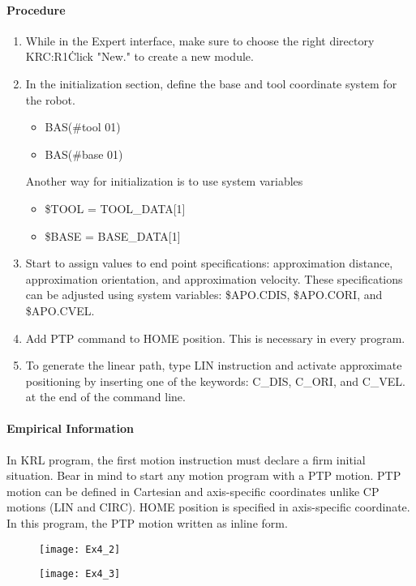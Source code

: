 \documentclass[]{book}
\begin{document}
\paragraph{Procedure}
\begin{enumerate}
	\item While in the Expert interface, make sure to choose the right directory KRC:R1\.Click "New." to create a new module.
	\item In the initialization section, define the base and tool coordinate system for the robot.
	\begin{itemize}
		\item BAS(\#tool 01)
		\item BAS(\#base 01)
	\end{itemize}
		Another way for initialization is to use system variables
		\begin{itemize} 
		\item \$TOOL = TOOL\_DATA[1]
		\item \$BASE = BASE\_DATA[1]
	\end{itemize}
\item Start to assign values to end point specifications: approximation distance, approximation orientation, and approximation velocity. These specifications can be adjusted using system variables: \$APO.CDIS, \$APO.CORI, and \$APO.CVEL.
\item Add PTP command to HOME position. This is necessary in every program.
\item To generate the linear path, type LIN instruction and activate approximate positioning by inserting one of the keywords: C\_DIS, C\_ORI, and C\_VEL. at the end of the command line.

\end{enumerate}
\paragraph{Empirical Information}
In KRL program, the first motion instruction must declare a firm initial situation. Bear in mind to start any motion program with a PTP motion. PTP motion can be defined in Cartesian and axis-specific coordinates unlike CP motions (LIN and CIRC). 
HOME position is specified in axis-specific coordinate. In this program, the PTP motion written as inline form.
\begin{figure}[H]
	\centering
	\texttt{[image: Ex4\_2]}
\end{figure}
\begin{figure}[H]
	\centering
	\texttt{[image: Ex4\_3]}
\end{figure}
\newpage
\end{document}
